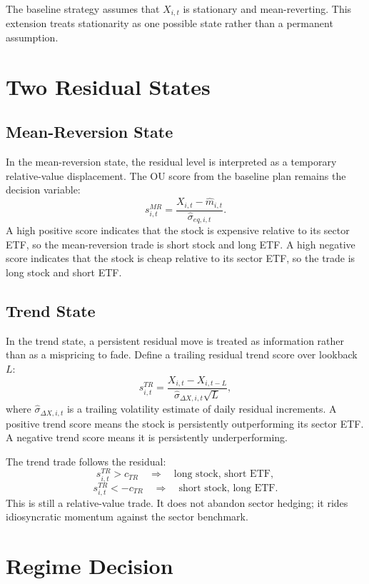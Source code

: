\documentclass[11pt]{article}
\begin{document}
The baseline strategy assumes that $X_{i,t}$ is stationary and mean-reverting.
This extension treats stationarity as one possible state rather than a
permanent assumption.

\section{Two Residual States}

\subsection{Mean-Reversion State}

In the mean-reversion state, the residual level is interpreted as a temporary
relative-value displacement. The OU score from the baseline plan remains the
decision variable:
\[
    s^{MR}_{i,t}
    =
    \frac{X_{i,t}-\widehat{m}_{i,t}}
         {\widehat{\sigma}_{eq,i,t}}.
\]
A high positive score indicates that the stock is expensive relative to its
sector ETF, so the mean-reversion trade is short stock and long ETF. A high
negative score indicates that the stock is cheap relative to its sector ETF,
so the trade is long stock and short ETF.

\subsection{Trend State}

In the trend state, a persistent residual move is treated as information
rather than as a mispricing to fade. Define a trailing residual trend score
over lookback $L$:
\[
    s^{TR}_{i,t}
    =
    \frac{X_{i,t}-X_{i,t-L}}
         {\widehat{\sigma}_{\Delta X,i,t}\sqrt{L}},
\]
where $\widehat{\sigma}_{\Delta X,i,t}$ is a trailing volatility estimate of
daily residual increments. A positive trend score means the stock is
persistently outperforming its sector ETF. A negative trend score means it is
persistently underperforming.

The trend trade follows the residual:
\[
    s^{TR}_{i,t}>c_{TR}
    \quad\Rightarrow\quad
    \text{long stock, short ETF},
\]
\[
    s^{TR}_{i,t}<-c_{TR}
    \quad\Rightarrow\quad
    \text{short stock, long ETF}.
\]
This is still a relative-value trade. It does not abandon sector hedging; it
rides idiosyncratic momentum against the sector benchmark.

\section{Regime Decision}
\end{document}
